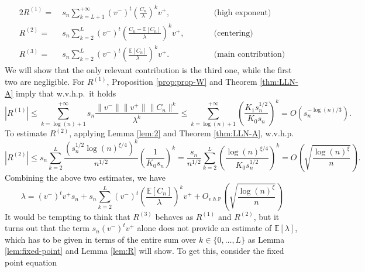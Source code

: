\documentclass[11pt,oneside]{amsart}
\theoremstyle{plain}
\numberwithin{equation}{section}
\newcommand{\wehp}{{w.v.h.p.~}}
\newcommand{\wethp}{{w.v.h.p.~}}
\newcommand{\E}{\mathbb{E}}
\newcommand{\p}{\mathbb{P}}
\newcommand{\centered}{C_n}
\newcommand{\term}{R}
\newcommand{\x}{{{v}}^+}
\newcommand{\y}{{{v}}^-}
\newcommand{\scaling}{s_n}
\newcommand{\Ohp}{O_{v.h.\p}}
\begin{document}
\begin{alignat}{2}
    \term^{(1)}=& \ \scaling \sum_{k=L+1}^{+\infty} (v^-)^t\left(\frac{\centered}{\lambda}\right)^k v^+, \qquad &&\text{(high exponent)} \\
    \term^{(2)}=& \ \scaling \sum_{k=2}^{L} (v^-)^t \left(\frac{\centered-\E[\centered]}{\lambda}\right)^k v^+, \qquad &&\text{(centering)}\\
    \term^{(3)}=& \ \scaling \sum_{k=2}^{L} (v^-)^t \left(\frac{\E[\centered]}{\lambda}\right)^k v^+. \qquad  &&\text{(main contribution)}   
\end{alignat}
We will show that the only relevant contribution is the third one, while the first two are negligible.
For $\term^{(1)}$, Proposition \ref{prop:prop-W} and Theorem \ref{thm:LLN-A} imply that \wehp it holds
\begin{equation}
    |\term^{(1)}|
    \le \sum_{k=\log(n)+1}^{+\infty} \scaling\frac{\|v^-\|\|v^+\|\|C_n\|^k}{\lambda^k}
    \le \sum_{k=\log(n)+1}^{+\infty} \left(\frac{K_1\scaling^{1/2}}{K_0\scaling }\right)^k
    = O\left({\scaling^{-\log(n)/3}}\right).
\end{equation}
To estimate $\term^{(2)}$, applying Lemma \ref{lem:2} and Theorem \ref{thm:LLN-A}, \wethp
\begin{equation}
    |\term^{(2)}|\le \scaling \sum_{k=2}^L \frac{\left(\scaling^{1/2} \log(n)^{\xi/4}\right)^k}{n^{1/2}} \left(\frac{1}{K_0\scaling}\right)^k 
    = \frac{\scaling}{n^{1/2}}\sum_{k=2}^L \left(\frac{\log(n)^{\xi/4}}{K_0\scaling^{1/2}}\right)^{k}
    = O\left(\sqrt{\frac{\log(n)^{\xi}}{n}}\right).
\end{equation}
Combining the above two estimates, we have
\begin{equation} \label{eq:lambda}
    \lambda 
    = (\y)^t\x \scaling + \scaling \sum_{k=2}^{L} (v^-)^t \left(\frac{\E[\centered]}{\lambda}\right)^k v^+ + \Ohp\left(\sqrt{\frac{\log(n)^{\xi}}{n}}\right)
\end{equation}
It would be tempting to think that $\term^{(3)}$ behaves as $\term^{(1)}$ and $\term^{(2)}$, but it turns out that the term $\scaling(v^-)^tv^+ $ alone does not provide an estimate of $\E[\lambda]$, which has to be given in terms of the entire sum over $k \in \{0,\dots,L\}$ as Lemma \ref{lem:fixed-point} and Lemma \ref{lem:R} will show.
To get this, consider the fixed point equation
\end{document}
